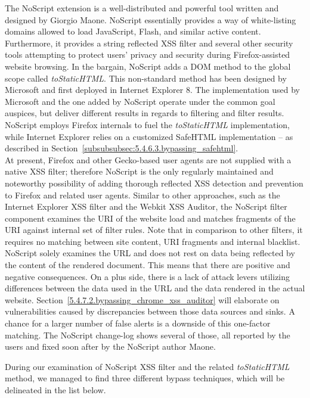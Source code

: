       The NoScript extension is a well-distributed and powerful tool written and designed by Giorgio Maone. NoScript essentially provides a way of white-listing domains allowed to load JavaScript, Flash, and similar active content. Furthermore, it provides a string reflected XSS filter and several other security tools attempting to protect users' privacy and security during Firefox-assisted website browsing. In the bargain, NoScript adds a DOM method to the global scope called \textit{toStaticHTML}. This non-standard method has been designed by Microsoft and first deployed in Internet Explorer 8. The implementation used by Microsoft and the one added by NoScript operate under the common goal auspices, but deliver different results in regards to filtering and filter results. NoScript employs Firefox internals to fuel the \textit{toStaticHTML} implementation, while Internet Explorer relies on a customized SafeHTML implementation -- as described in Section~\ref{subsubsubsec:5.4.6.3.bypassing_safehtml}.\\

      At present, Firefox and other Gecko-based user agents are not supplied with a native XSS filter; therefore NoScript is the only regularly maintained and noteworthy possibility of adding thorough reflected XSS detection and prevention to Firefox and related user agents. Similar to other approaches, such as the Internet Explorer XSS filter and the Webkit XSS Auditor, the NoScript filter component examines the URI of the website load and matches fragments of the URI against internal set of filter rules. Note that in comparison to other filters, it requires no matching between site content, URI fragments and internal blacklist. NoScript solely examines the URL and does not rest on data being reflected by the content of the rendered document. This means that there are positive and negative consequences. On a plus side, there is a lack of attack levers utilizing differences between the data used in the URL and the data rendered in the actual website. Section~\ref{5.4.7.2.bypassing_chrome_xss_auditor} will 
elaborate on vulnerabilities caused by discrepancies between those data sources and sinks. A chance for a larger number of false alerts is a downside of this one-factor matching. The NoScript change-log shows several of those, all reported by the users and fixed soon after by the NoScript author Maone.

      During our examination of NoScript XSS filter and the related \textit{toStaticHTML} method, we managed to find three different bypass techniques, which will be delineated in the list below.
      
